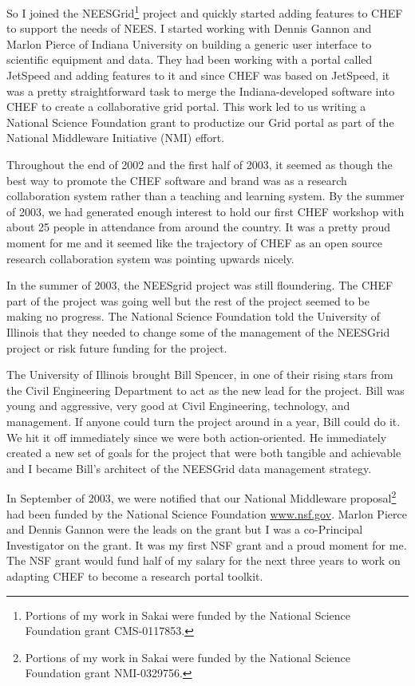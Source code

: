 \documentclass[12pt]{book}
\begin{document}
So I joined the NEESGrid\footnote{Portions of
my work in Sakai were funded by the National Science
Foundation grant CMS-0117853.} project and quickly started adding features
to CHEF to support the needs of NEES.  I started working with
Dennis Gannon and Marlon Pierce of Indiana University on building a generic
user interface to scientific equipment and data.  They had been
working with a portal called JetSpeed and adding features to it
and since CHEF was based on JetSpeed, it was a pretty straightforward
task to merge the Indiana-developed software into CHEF to
create a collaborative grid portal.  This work led to us writing
a National Science Foundation grant to productize our Grid portal
as part of the National Middleware Initiative (NMI) effort.

Throughout the end of 2002 and the first half of 2003, it seemed
as though the best way to promote the CHEF software and brand
was as a research collaboration system rather than a teaching
and learning system.  By the summer of 2003, we had generated enough
interest to hold our first CHEF workshop with about 25 people
in attendance from around the country.  It was a pretty proud
moment for me and it seemed like the trajectory of CHEF
as an open source research collaboration system was pointing
upwards nicely.

In the summer of 2003, the NEESgrid project was
still floundering.  The CHEF part of the project was going well
but the rest of the project seemed to be making no progress.
The National Science Foundation told the University of Illinois
that they needed to change some of the management of the
NEESGrid project or risk future funding for the project.

The University of Illinois brought Bill Spencer, in one of their rising
stars from the Civil Engineering Department to act as the
new lead for the project.  Bill was young and
aggressive, very good at Civil Engineering,
technology, and management.  If anyone could turn the project
around in a year, Bill could do it.  We hit
it off immediately since we were both action-oriented.
He immediately created a new set of goals
for the project that were both tangible and achievable and
I became Bill's architect of the
NEESGrid data management strategy.

In September of 2003, we were notified that our National
Middleware proposal\footnote{Portions of
my work in Sakai were funded by the National Science
Foundation grant  NMI-0329756.}
had been funded by the National
Science Foundation \url{www.nsf.gov}.
Marlon Pierce and Dennis Gannon were
the leads on the grant but I was a co-Principal Investigator
on the grant.  It was my first NSF grant and a
proud moment for me.  The NSF grant would fund half of my
salary for the next three years to work on adapting
CHEF to become a research portal toolkit.
\end{document}
